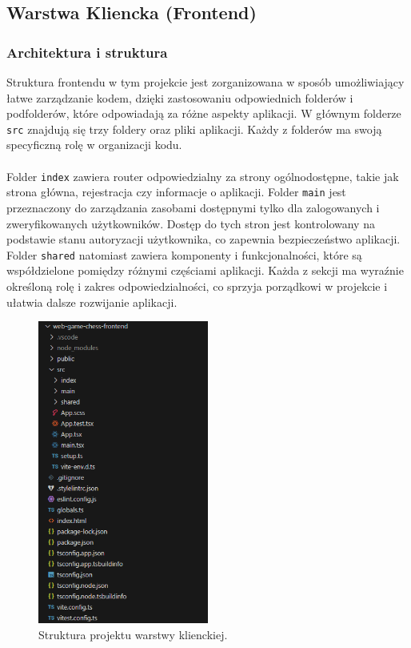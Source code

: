 \documentclass[12pt,a4paper]{article}
\begin{document}
\newpage

\subsection{Warstwa Kliencka (Frontend)}

\subsubsection{Architektura i struktura}

\noindent
Struktura frontendu w tym projekcie jest zorganizowana w sposób umożliwiający łatwe zarządzanie kodem, dzięki zastosowaniu odpowiednich folderów i podfolderów, które odpowiadają za różne aspekty aplikacji. W głównym folderze \texttt{src} znajdują się trzy foldery oraz pliki aplikacji. Każdy z folderów ma swoją specyficzną rolę w organizacji kodu.
\\\\
Folder \texttt{index} zawiera router odpowiedzialny za strony ogólnodostępne, takie jak strona główna, rejestracja czy informacje o aplikacji. Folder \texttt{main} jest przeznaczony do zarządzania zasobami dostępnymi tylko dla zalogowanych i zweryfikowanych użytkowników. Dostęp do tych stron jest kontrolowany na podstawie stanu autoryzacji użytkownika, co zapewnia bezpieczeństwo aplikacji. Folder \texttt{shared} natomiast zawiera komponenty i funkcjonalności, które są współdzielone pomiędzy różnymi częściami aplikacji. Każda z sekcji ma wyraźnie określoną rolę i zakres odpowiedzialności, co sprzyja porządkowi w projekcie i ułatwia dalsze rozwijanie aplikacji.

\vspace{0.5cm}
\begin{figure}[h!]
    \centering
    \includegraphics[width=0.5\textwidth]{images/struktura_front.png}
    \caption{Struktura projektu warstwy klienckiej.}
\end{figure}
\end{document}
